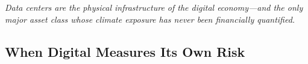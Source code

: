 \thispagestyle{chapterstart}

\noindent\textit{Data centers are the physical infrastructure of the digital economy---and the only major asset class whose climate exposure has never been financially quantified.}

\vspace{4mm}

\subsection*{When Digital Measures Its Own Risk}\label{toc:digital}
\greensep

